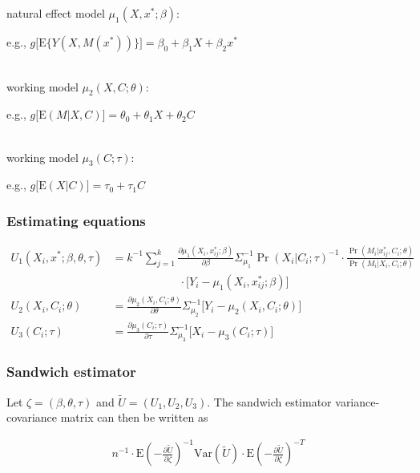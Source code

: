 \documentclass[]{article}
\begin{document}
natural effect model $\mu_1(X,x^*;\beta)$:
\begin{flushright} e.g., $g\big[\textrm{E}\{Y(X,M(x^*))\}\big] = \beta_0 + \beta_1 X + \beta_2 x^*$\end{flushright}\\[1em]
working model $\mu_2(X,C;\theta)$:
\begin{flushright} e.g., $g\big[\textrm{E}(M\vert X,C)\big] = \theta_0 + \theta_1 X + \theta_2 C$\end{flushright}\\[1em]
working model $\mu_3(C;\tau)$:
\begin{flushright} e.g., $g\big[\textrm{E}(X\vert C)\big] = \tau_0 + \tau_1 C$ \end{flushright}

\subsubsection*{Estimating equations}

\begin{align*}
\displaystyle U_{1}(X_i,x^*;\beta,\theta,\tau) &= k^{-1} \sum_{j=1}^{k} \frac{\partial \mu_1(X_i,x^*_{ij};\beta)}{\partial \beta} \Sigma_{\mu_1}^{-1} \Pr(X_i\vert C_i;\tau)^{-1} \cdot \frac{\Pr(M_i\vert x^*_{ij},C_i;\theta)}{\Pr(M_i\vert X_i,C_i;\theta)}\\[-0.6em] & \qquad \qquad \qquad \cdot \big[ Y_i - \mu_1(X_i,x^*_{ij};\beta) \big]\\[1em]
\displaystyle U_{2}(X_i,C_i;\theta) &= \frac{\partial \mu_2(X_i,C_i;\theta)}{\partial \theta} \Sigma_{\mu_2}^{-1} \big[ Y_i - \mu_2(X_i,C_i;\theta) \big]\\[1em]
\displaystyle U_{3}(C_i;\tau) &= \frac{\partial \mu_3(C_i;\tau)}{\partial \tau} \Sigma_{\mu_3}^{-1} \big[ X_i - \mu_3(C_i;\tau) \big]
\end{align*}

\subsubsection*{Sandwich estimator}

Let $\zeta = (\beta, \theta, \tau)$ and $\tilde U = (U_1, U_2, U_3)$. The sandwich estimator variance-covariance matrix can then be written as

\begin{eqnarray*}
\displaystyle n^{-1}\cdot\mbox{E}\left(-\frac{\partial \tilde U}{\partial \zeta}\right)^{-1} \mbox{Var}(\tilde U) \cdot \mbox{E}\left(-\frac{\partial \tilde U}{\partial \zeta}\right)^{-T}
\end{eqnarray*}
\end{document}
